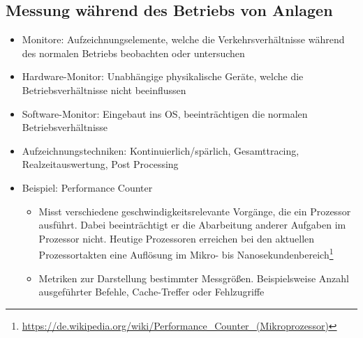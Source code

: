 \subsection{Messung während des Betriebs von Anlagen}
\begin{itemize}
	\item Monitore: Aufzeichnungselemente, welche die Verkehrsverhältnisse während des normalen Betriebs beobachten oder untersuchen
	\item Hardware-Monitor: Unabhängige physikalische Geräte, welche die Betriebsverhältnisse nicht beeinflussen
	\item Software-Monitor: Eingebaut ins OS, beeinträchtigen die normalen Betriebsverhältnisse
	\item Aufzeichnungstechniken: Kontinuierlich/spärlich, Gesamttracing, Realzeitauswertung, Post Processing 
	\item Beispiel: Performance Counter
	\begin{itemize}
		\item Misst verschiedene geschwindigkeitsrelevante Vorgänge, die ein Prozessor ausführt. Dabei beeinträchtigt er die Abarbeitung anderer Aufgaben im Prozessor nicht. Heutige Prozessoren erreichen bei den aktuellen Prozessortakten eine Auflösung im Mikro- bis Nanosekundenbereich\footnote{\url{https://de.wikipedia.org/wiki/Performance_Counter_(Mikroprozessor)}}
		\item Metriken zur Darstellung bestimmter Messgrößen. Beispielsweise Anzahl ausgeführter Befehle, Cache-Treffer oder Fehlzugriffe
	\end{itemize}
\end{itemize}

